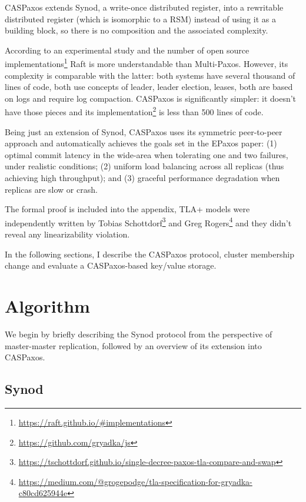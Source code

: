 \documentclass[12pt]{article}
\begin{document}
CASPaxos extends Synod, a write-once distributed register, into a rewritable distributed register (which is isomorphic to a RSM) instead of using it as a building block, so there is no composition and the associated complexity.

According to an experimental study\cite{raft} and the number of open source implementations\footnote{\href{https://raft.github.io/\#implementations}{https://raft.github.io/\#implementations}} Raft is more understandable than Multi-Paxos. However, its complexity is comparable with the latter: both systems\cite{chubby}\cite{raft} have several thousand of lines of code, both use concepts of leader, leader election, leases, both are based on logs and require log compaction. CASPaxos is significantly simpler: it doesn't have those pieces and its implementation\footnote{\href{https://github.com/gryadka/js}{https://github.com/gryadka/js}} is less than 500 lines of code.

Being just an extension of Synod, CASPaxos uses its symmetric peer-to-peer approach and automatically achieves the goals set in the EPaxos\cite{epaxos} paper: (1) optimal commit latency in the wide-area when tolerating one and two failures, under realistic conditions; (2) uniform load balancing across all replicas (thus achieving high throughput); and (3) graceful performance degradation when replicas are slow or crash.

The formal proof is included into the appendix, TLA+ models were independently written by Tobias Schottdorf\footnote{\href{https://tschottdorf.github.io/single-decree-paxos-tla-compare-and-swap}{https://tschottdorf.github.io/single-decree-paxos-tla-compare-and-swap}} and Greg Rogers\footnote{\href{https://medium.com/@grogepodge/tla-specification-for-gryadka-c80cd625944e}{https://medium.com/@grogepodge/tla-specification-for-gryadka-c80cd625944e}} and they didn't reveal any linearizability violation.

In the following sections, I describe the CASPaxos protocol, cluster membership change and evaluate a CASPaxos-based key/value storage.

\section{Algorithm}

We begin by briefly describing the Synod protocol from the perspective of master-master replication, followed by an overview of its extension into CASPaxos.

\subsection{Synod}
\end{document}
